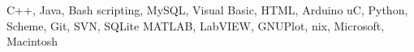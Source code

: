 
\citembullet C++, Java, Bash scripting,  MySQL, Visual Basic, HTML, Arduino uC, Python, Scheme, Git, SVN, SQLite
\citembullet MATLAB, LabVIEW, GNUPlot, \LaTeXe
\citembullet *nix, Microsoft, Macintosh


